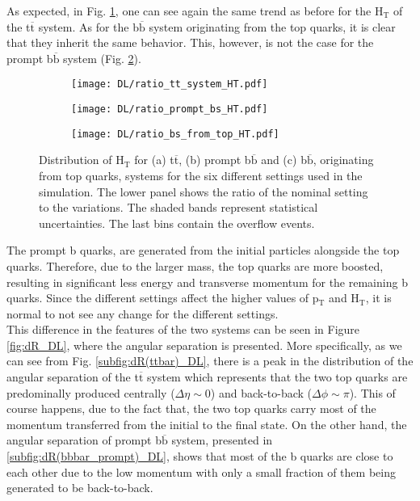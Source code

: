 \indent As expected, in Fig. \ref{subfig:HT(ttbar)_DL}, one can see again the same trend as before for the H$_{\text{T}}$ of the t$\overline{\text{t}}$ system. As for the b$\overline{\text{b}}$ system originating from the top quarks, it is clear that they inherit the same behavior. This, however, is not the case for the prompt b$\overline{\text{b}}$ system (Fig. \ref{subfig:HT(bbbar_prompt)_DL}).\\
\begin{figure}[htb!]
    \centering
    \begin{subfigure}{0.49\textwidth}
        \centering
        \texttt{[image: DL/ratio\_tt\_system\_HT.pdf]}
        \caption{}
        \label{subfig:HT(ttbar)_DL}
    \end{subfigure}
    \hfill
    \begin{subfigure}{0.49\textwidth}
        \centering
        \texttt{[image: DL/ratio\_prompt\_bs\_HT.pdf]}
        \caption{}
        \label{subfig:HT(bbbar_prompt)_DL}
    \end{subfigure}
    \hfill
    \begin{subfigure}{0.49\textwidth}
        \centering
        \texttt{[image: DL/ratio\_bs\_from\_top\_HT.pdf]}
        \caption{}
        \label{subfig:HT(bbbar)_DL}
    \end{subfigure}
    \caption{Distribution of H$_{\text{T}}$ for (a) t$\overline{\text{t}}$, (b) prompt b$\overline{\text{b}}$ and (c) b$\overline{\text{b}}$, originating from top quarks, systems for the six different settings used in the simulation. The lower panel shows the ratio of the nominal setting to the variations. The shaded bands represent statistical uncertainties. The last bins contain the overflow events.}
    \label{fig:HT_DL}
\end{figure}
\indent The prompt b quarks, are generated from the initial particles alongside the top quarks. Therefore, due to the larger mass, the top quarks are more boosted, resulting in significant less energy and transverse momentum for the remaining b quarks. Since the different settings affect the higher values of p$_{\text{T}}$ and H$_{\text{T}}$, it is normal to not see any change for the different settings.\\ 
\indent This difference in the features of the two systems can be seen in Figure \ref{fig:dR_DL}, where the angular separation is presented. More specifically, as we can see from Fig. \ref{subfig:dR(ttbar)_DL}, there is a peak in the distribution of the angular separation of the t$\overline{\text{t}}$ system which represents that the two top quarks are predominally produced centrally ($\Delta\eta \sim 0$) and back-to-back ($\Delta\phi \sim \pi$). This of course happens, due to the fact that, the two top quarks carry most of the momentum transferred from the initial to the final state. On the other hand, the angular separation of prompt b$\overline{\text{b}}$ system, presented in \ref{subfig:dR(bbbar_prompt)_DL}, shows that most of the b quarks are close to each other due to the low momentum with only a small fraction of them being generated to be back-to-back.\\
